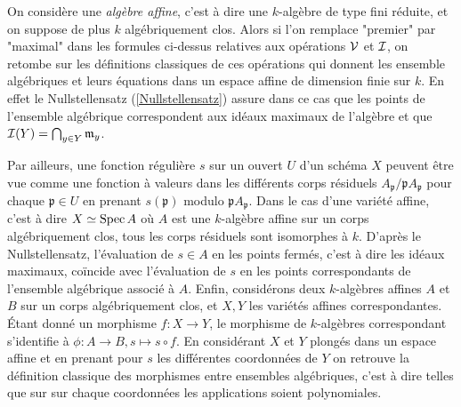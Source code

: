 \begin{rem}
On considère une \textit{algèbre affine}, c'est à dire une $k$-algèbre de type fini réduite, et on suppose de plus $k$ algébriquement clos. Alors si l'on remplace "premier" par "maximal" dans les formules ci-dessus relatives aux opérations $\mathcal{V}$ et $\mathcal{I}$, on retombe sur les définitions classiques de ces opérations qui donnent les ensemble algébriques et leurs équations dans un espace affine de dimension finie sur $k$. En effet le Nullstellensatz (\ref{Nullstellensatz}) assure dans ce cas que les points de l'ensemble algébrique correspondent aux idéaux maximaux de l'algèbre et que $\mathcal{I}(Y)=\bigcap_{y\in Y}\mathfrak{m}_y$.

Par ailleurs, une fonction régulière $s$ sur un ouvert $U$ d'un schéma $X$ peuvent être vue comme une fonction à valeurs dans les différents corps résiduels $A_\mathfrak{p}/\mathfrak{p}A_\mathfrak{p}$ pour chaque $\mathfrak{p}\in U$ en prenant $s(\mathfrak{p})$ modulo $\mathfrak{p}A_\mathfrak{p}$. Dans le cas d'une variété affine, c'est à dire $X\simeq \operatorname{Spec} A$ où $A$ est une $k$-algèbre affine sur un corps algébriquement clos, tous les corps résiduels sont isomorphes à $k$. D'après le Nullstellensatz, l'évaluation de $s\in A$ en les points fermés, c'est à dire les idéaux maximaux, coïncide avec l'évaluation de $s$ en les points correspondants de l'ensemble algébrique associé à $A$. Enfin, considérons deux $k$-algèbres affines $A$ et $B$ sur un corps algébriquement clos, et $X, Y$ les variétés affines correspondantes. Étant donné un morphisme $f:X\rightarrow Y$, le morphisme de $k$-algèbres correspondant s'identifie à $\phi:A\rightarrow B,s\mapsto s\circ f$. En considérant $X$ et $Y$ plongés dans un espace affine et en prenant pour $s$ les différentes coordonnées de $Y$ on retrouve la définition classique des morphismes entre ensembles algébriques, c'est à dire telles que sur sur chaque coordonnées les applications soient polynomiales.
\end{rem}

